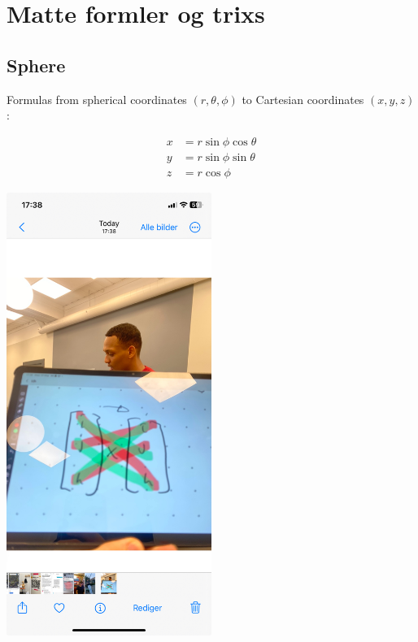 \section{Matte formler og trixs}

\subsection{Sphere}
Formulas from spherical coordinates \((r, \theta, \phi)\) to Cartesian coordinates \((x, y, z)\):

\begin{align*}
x &= r \sin\phi \cos\theta \\
y &= r \sin\phi \sin\theta \\
z &= r \cos\phi
\end{align*}

\includegraphics[width=0.5\textwidth]{figures/cross.jpeg}
\newpage
\begin{figure}
    \centering
    
\end{figure}
